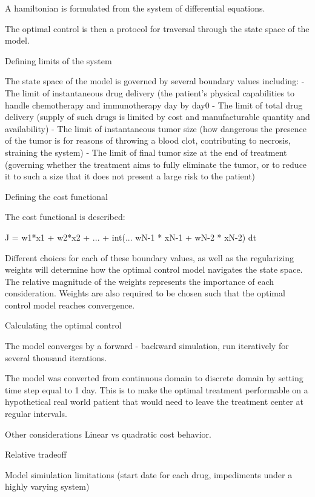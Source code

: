 \documentclass{article}
\begin{document}
A hamiltonian is formulated from the system of differential equations. 

The optimal control is then a protocol for traversal through the state space of the model. 



Defining limits of the system

The state space of the model is governed by several boundary values including:
- The limit of instantaneous drug delivery (the patient's physical capabilities to handle chemotherapy and immunotherapy day by day0
- The limit of total drug delivery (supply of such drugs is limited by cost and manufacturable quantity and availability)
- The limit of instantaneous tumor size (how dangerous the presence of the tumor is for reasons of throwing a blood clot, contributing to necrosis, straining the system) 
- The limit of final tumor size at the end of treatment (governing whether the treatment aims to fully eliminate the tumor, or to reduce it to such a size that it does not present a large risk to the patient)



Defining the cost functional

The cost functional is described: 

J = w1*x1 + w2*x2 + ... + int(... wN-1 * xN-1 + wN-2 * xN-2) dt


Different choices for each of these boundary values, as well as the regularizing weights will determine how the optimal control model navigates the state space. The relative magnitude of the weights represents the importance of each consideration. Weights are also required to be chosen such that the optimal control model reaches convergence. 


Calculating the optimal control

The model converges by a forward - backward simulation, run iteratively for several thousand iterations. 

The model was converted from continuous domain to discrete domain by setting time step equal to 1 day. This is to make the optimal treatment performable on a hypothetical real world patient that would need to leave the treatment center at regular intervals. 



Other considerations
Linear vs quadratic cost behavior. 

Relative tradeoff

Model simiulation limitations (start date for each drug, impediments under a highly varying system)
\end{document}
